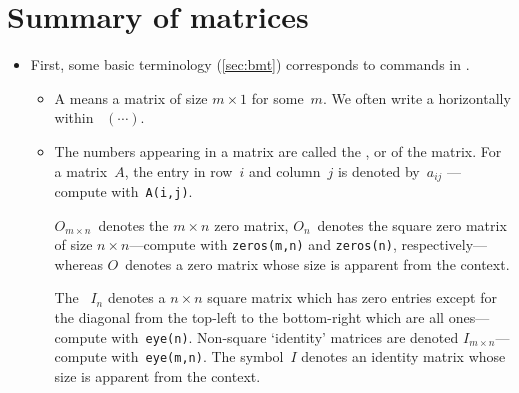 
\section{Summary of matrices}
\label{sec:summ}

\begin{itemize}
\def\index#1{}%

\subsubsection{Matrix operations and algebra}

\item First, some basic terminology (\cref{sec:bmt}) corresponds to commands in \script.
\begin{itemize}
\itemhi A  is a rectangular array of real numbers, written inside ~\(\begin{bmatrix} \cdots  \end{bmatrix}\)---create in \script\ with \verb|[...;...;...]|.

\itemhi The  of a matrix is written \(m\times n\) where \(m\)~is the number of rows and \(n\)~is the number of columns---compute with \verb|size(A)| for matrix~\verb|A|.
If \(m=n\)\,, then it is called a .

\item A  means a matrix of size \(m\times 1\) for some~\(m\).
We often write a  horizontally within ~\((\cdots )\).

\item The numbers appearing in a matrix are called the ,  or  of the matrix.
For a matrix~\(A\), the entry in row~\(i\) and column~\(j\) is denoted by~\(a_{ij}\) ---compute with~\verb|A(i,j)|.

\itemme \(O_{m\times n}\)~denotes the \(m\times n\) zero matrix, \(O_n\)~denotes the square zero matrix of size \(n\times n\)---compute with \verb|zeros(m,n)| and \verb|zeros(n)|, respectively---whereas \(O\)~denotes a zero matrix whose size is apparent from the context.

\itemme The ~\(I_n\) denotes a \(n\times n\) square matrix which has zero entries except for the diagonal from the top-left to the bottom-right which are all ones---compute with~\index{eye()@\texttt{eye()}}\verb|eye(n)|.
Non-square `identity' matrices are denoted \(I_{m\times n}\)---compute with~\verb|eye(m,n)|.
The symbol~\(I\) denotes an identity matrix whose size is apparent from the context.


\end{itemize}
\end{itemize}

